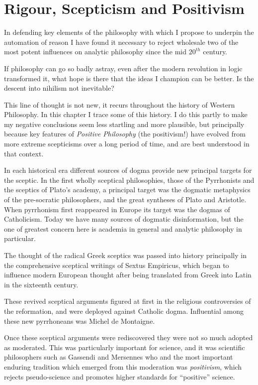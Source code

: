 \def\rbjidpositivism{$$Id: positivism.tex,v 1.1 2011/11/04 16:38:42 rbj Exp $$}

\chapter{Rigour, Scepticism and Positivism}\label{RogourSkepticismPositivsim}

In defending key elements of the philosophy with which I propose to underpin the automation of reason I have found it necessary to reject wholesale two of the most potent influences on analytic philosophy since the mid $20^{th}$ century.

If philosophy can go so badly astray, even after the modern revolution in logic transformed it, what hope is there that the ideas I champion can be better.
Is the descent into nihilism not inevitable?

This line of thought is not new, it recurs throughout the history of Western Philosophy.
In this chapter I trace some of this history.
I do this partly to make my negative conclusions seem less startling and more plausible, but principally because key features of \emph{Positive Philosophy} (the positivism!) have evolved from more extreme scepticisms over a long period of time, and are best understood in that context.

In each historical era different sources of dogma provide new principal targets for the sceptic.
In the first wholly sceptical philosophies, those of the Pyrrhonists and the sceptics of Plato's academy, a principal target was the dogmatic metaphysics of the pre-socratic philosophers, and the great syntheses of Plato and Aristotle.
When pyrrhonism first reappeared in Europe its target was the dogmas of Catholicism.
Today we have many sources of dogmatic disinformation, but the one of greatest concern here is academia in general and analytic philosophy in particular.

The thought of the radical Greek sceptics was passed into history principally in the comprehensive sceptical writings of Sextus Empiricus\cite{sextusempiricusOOP}, which began to influence modern European thought after being translated from Greek into Latin in the sixteenth century.

These revived sceptical arguments figured at first in the religious controversies of the reformation, and were deployed against Catholic dogma.
Influential among these new pyrrhoneans was Michel de Montaigne.

Once these sceptical arguments were rediscovered they were not so much adopted as moderated.
This was particularly important for science, and it was scientific philosophers such as Gassendi and Mersennes who
and the most important enduring tradition which emerged from this moderation was \emph{positivism}, which rejects pseudo-science and promotes higher standards for ``positive'' science.

